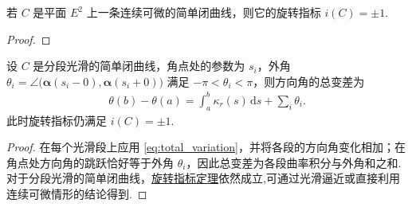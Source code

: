 \documentclass[../../main.tex]{subfiles}%
\begin{document}
\begin{theorem}[旋转指标定理]\label{theorem:旋转指标定理}
若 $C$ 是平面 $E^2$ 上一条连续可微的简单闭曲线，则它的旋转指标 $i(C)=\pm 1$.
\end{theorem}
\begin{proof}



\end{proof}

\begin{proposition}[分段光滑简单闭曲线的旋转指标]
设 $C$ 是分段光滑的简单闭曲线，角点处的参数为 $s_i$，外角 $\theta_i=\angle\bigl(\bm{\alpha}(s_i-0),\bm{\alpha}(s_i+0)\bigr)$ 满足 $-\pi<\theta_i<\pi$，则方向角的总变差为
\begin{align}
\theta(b)-\theta(a)=\int_a^b \kappa_r(s)\,\mathrm{d}s+\sum_i \theta_i. \label{eq:piecewise_total_variation}
\end{align}
此时旋转指标仍满足 $i(C)=\pm 1$.
\end{proposition}
\begin{proof}

在每个光滑段上应用 \eqref{eq:total_variation}，并将各段的方向角变化相加；在角点处方向角的跳跃恰好等于外角 $\theta_i$，因此总变差为各段曲率积分与外角和之和. 对于分段光滑的简单闭曲线，\hyperref[theorem:旋转指标定理]{旋转指标定理}依然成立,可通过光滑逼近或直接利用连续可微情形的结论得到.

\end{proof}
\end{document}
